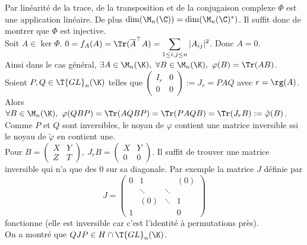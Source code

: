 \documentclass[8pt]{book}
\begin{document}
	Par linéarité de la trace, de la transposition et de la conjugaison complexe $\Phi$ est une application linéaire. De plus $\dim(\M_n(\C))=\dim(\M_n(\C)^*)$. Il suffit donc de montrer que $\Phi$ est injective.\\
	Soit $A\in \ker\Phi$. $0=f_A(A)=\Tr(\overline{A}^\top A)=\displaystyle\sum_{1\leq i,j\leq n}|A_{ij}|^2$. Donc $A=0$.\\
	Ainsi dans le cas général, $\exists A\in \M_n(\K),\ \forall B\in \M_n(\K),\ \varphi(B)=\Tr(AB)$.\\
	Soient $P,Q\in \T{GL}_n(\K)$ telles que $\begin{pmatrix}
		I_r&0\\
		0&0
	\end{pmatrix}:=J_r=PAQ$ avec $r=\rg(A)$. Alors $\forall B\in \M_n(\K),\ \varphi(QBP)=\Tr(AQBP)=\Tr(PAQB)=\Tr(J_rB):=\tilde\varphi(B)$. Comme $P$ et $Q$ sont inversibles, le noyau de $\varphi$ contient une matrice inversible ssi le noyau de $\tilde\varphi$ en contient une.\\
	Pour $B=\begin{pmatrix}
		X&Y\\
		Z&T
	\end{pmatrix},\ J_rB=\begin{pmatrix}
	X&Y\\
	0&0
	\end{pmatrix}$. Il suffit de trouver une matrice inversible qui n'a que des $0$ sur sa diagonale. Par exemple la matrice $J$ définie par \[J=\begin{pmatrix}
	0 & 1 &  &(0)\\
	&\ddots&\ddots&\\
	&(0)&\ddots&1\\
	1&&&0
	\end{pmatrix}\] fonctionne (elle est inversible car c'est l'identité à permutations près).\\
	On a montré que $QJP\in H\cap\T{GL}_n(\K)$.
	
\end{document}
